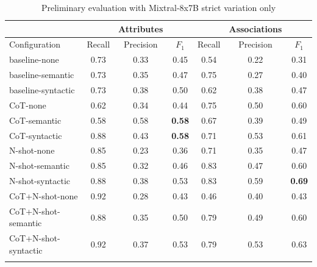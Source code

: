 \begin{table}[!h]
    \scriptsize
    \centering
    \setlength{\tabcolsep}{0.5em}
    \begin{tabular}{lcccccc}
    \toprule
         & & Attributes & & & Associations & \\
     \toprule
        Configuration & Recall & Precision & $F_1$ & Recall & Precision & $F_1$ \\
    \toprule
    
    \addlinespace
         baseline-none        & 0.73 & 0.33 & 0.45 & 0.54 & 0.22 & 0.31 \\
    	 baseline-semantic    & 0.73 & 0.35 & 0.47 & 0.75 & 0.27 & 0.40 \\
         baseline-syntactic   & 0.73 & 0.38 & 0.50 & 0.62 & 0.38 & 0.47 \\
         CoT-none             & 0.62 & 0.34 & 0.44 & 0.75 & 0.50 & 0.60 \\
         CoT-semantic         & 0.58 & 0.58 & \textbf{0.58} & 0.67 & 0.39 & 0.49 \\
         CoT-syntactic        & 0.88 & 0.43 & \textbf{0.58} & 0.71 & 0.53 & 0.61 \\
         N-shot-none          & 0.85 & 0.23 & 0.36 & 0.71 & 0.35 & 0.47 \\
         N-shot-semantic      & 0.85 & 0.32 & 0.46 & 0.83 & 0.47 & 0.60 \\
         N-shot-syntactic     & 0.88 & 0.38 & 0.53 & 0.83 & 0.59 & \textbf{0.69} \\
         CoT+N-shot-none      & 0.92 & 0.28 & 0.43 & 0.46 & 0.40 & 0.43 \\
         CoT+N-shot-semantic  & 0.88 & 0.35 & 0.50 & 0.79 & 0.49 & 0.60 \\
         CoT+N-shot-syntactic & 0.92 & 0.37 & 0.53 & 0.79 & 0.53 & 0.63 \\
    \addlinespace
    \bottomrule
    \addlinespace
    \end{tabular}
    \caption{Preliminary evaluation with Mixtral-8x7B strict variation only}
    \label{tab:preliminary-mixtral}
\end{table}


